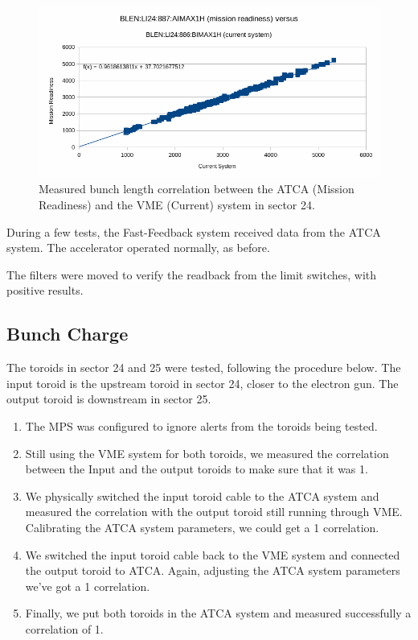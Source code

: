 \documentclass[letter,
        biblatex,   %
        keeplastbox,  %
        ]{jacow}
\begin{document}
\begin{figure}[!htb]
  \centering
  \includegraphics*[width=\columnwidth]{blen_result}
  \caption{Measured bunch length correlation between the ATCA (Mission Readiness) and the VME (Current) system in sector 24.}
  \label{fig:blen_result}
\end{figure}

During a few tests, the Fast-Feedback system received data from the ATCA system. The accelerator operated normally, as before.

The filters were moved to verify the readback from the limit switches, with positive results.

\subsection{Bunch Charge}
The toroids in sector 24 and 25 were tested, following the procedure below. The input toroid is the upstream toroid in sector 24, closer to the electron gun. The output toroid is downstream in sector 25.

\begin{enumerate}
  \item The MPS was configured to ignore alerts from the toroids being tested.
  \item Still using the VME system for both toroids, we measured the correlation between the Input and the output toroids to make sure that it was 1.
  \item We physically switched the input toroid cable to the ATCA system and measured the correlation with the output toroid still running through VME. Calibrating the ATCA system parameters, we could get a 1 correlation.
  \item We switched the input toroid cable back to the VME system and connected the output toroid to ATCA. Again, adjusting the ATCA system parameters we've got a 1 correlation.
  \item Finally, we put both toroids in the ATCA system and measured successfully a correlation of 1.
\end{enumerate}
\end{document}
